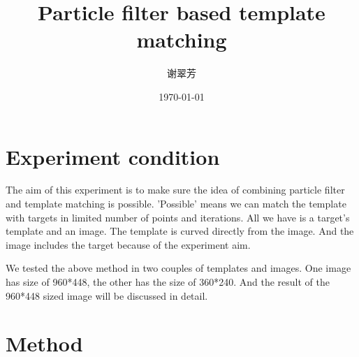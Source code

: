 \usepackage[UTF8]{ctex}
\renewcommand{\baselinestretch}{1.5}        %
\setlength{\arraycolsep}{2pt}   %
\allowdisplaybreaks[4] %
\setlength\jot{9pt} %

\hypersetup{
	colorlinks=true,       %
	linkcolor=blue,        %
	citecolor=blue,        %
	filecolor=magenta,     %
	urlcolor=blue
}

\title{Particle filter based template matching}
\author{谢翠芳}
\date{\today}
\maketitle


\section{Experiment condition}

The aim of this experiment is to make sure the idea of combining particle filter and template matching is possible. 'Possible' means we can match the template with targets in limited number of points and iterations. All we have is a target's template and an image. The template is curved directly from the image. And the image includes the target because of the experiment aim.

We tested the above method in two couples of templates and images. One image has size of 960*448, the other has the size of 360*240. And the result of the 960*448 sized image will be discussed in detail.


\section{Method}


